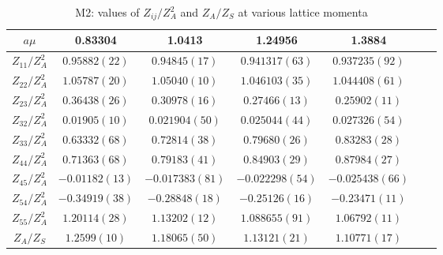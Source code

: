 \begin{table}
\begin{center}
\caption{\label{tab:M2renormvals}M2: values of $Z_{ij}/Z_A^2$ and $Z_A/Z_S$ at various lattice momenta}
\begin{tabular}{c|c c c c c c}
\hline
\hline
$a\mu$ & 0.83304 & 1.0413 & 1.24956 & 1.3884 \\
\hline
$Z_{11}/Z_A^2$ & $0.95882(22)$ & $0.94845(17)$ & $0.941317(63)$ & $0.937235(92)$ \\
\hline
$Z_{22}/Z_A^2$ & $1.05787(20)$ & $1.05040(10)$ & $1.046103(35)$ & $1.044408(61)$ \\
$Z_{23}/Z_A^2$ & $0.36438(26)$ & $0.30978(16)$ & $0.27466(13)$ & $0.25902(11)$ \\
$Z_{32}/Z_A^2$ & $0.01905(10)$ & $0.021904(50)$ & $0.025044(44)$ & $0.027326(54)$ \\
$Z_{33}/Z_A^2$ & $0.63332(68)$ & $0.72814(38)$ & $0.79680(26)$ & $0.83283(28)$ \\
\hline
$Z_{44}/Z_A^2$ & $0.71363(68)$ & $0.79183(41)$ & $0.84903(29)$ & $0.87984(27)$ \\
$Z_{45}/Z_A^2$ & $-0.01182(13)$ & $-0.017383(81)$ & $-0.022298(54)$ & $-0.025438(66)$ \\
$Z_{54}/Z_A^2$ & $-0.34919(38)$ & $-0.28848(18)$ & $-0.25126(16)$ & $-0.23471(11)$ \\
$Z_{55}/Z_A^2$ & $1.20114(28)$ & $1.13202(12)$ & $1.088655(91)$ & $1.06792(11)$ \\
\hline
$Z_A/Z_S$ & $1.2599(10)$ & $1.18065(50)$ & $1.13121(21)$ & $1.10771(17)$ \\
\hline
\hline
\end{tabular}
\end{center}
\end{table}